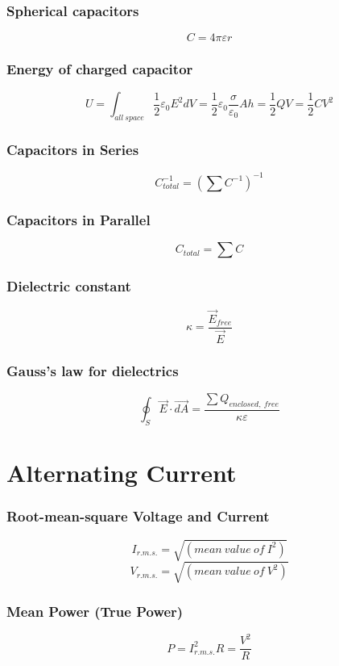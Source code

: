 \documentclass{article}
\begin{document}
\subsubsection*{Spherical capacitors}
\[C=4\pi\varepsilon r\]

\subsubsection*{Energy of charged capacitor}
\[U=\int_{all\ space} \frac{1}{2}\varepsilon_0E^2dV=\frac{1}{2}\varepsilon_0\frac{\sigma}{\varepsilon_0}Ah=\frac{1}{2}QV=\frac{1}{2}CV^2\]

\subsubsection*{Capacitors in Series}
\[C_{total}^{-1}=(\sum C^{-1})^{-1}\]

\subsubsection*{Capacitors in Parallel}
\[C_{total}=\sum C\]

\subsubsection*{Dielectric constant}
\[\kappa=\frac{\vec{E}_{free}}{\vec{E}}\]

\subsubsection*{Gauss's law for dielectrics}
\[\oint_S\vec{E}\cdot\vec{dA}=\frac{\sum Q_{enclosed,\ free}}{\kappa \varepsilon}\]

\section{Alternating Current}
\subsubsection*{Root-mean-square Voltage and Current}
\[I_{r.m.s.}=\sqrt{(mean\ value\ of\ I^2)}\]
\[V_{r.m.s.}=\sqrt{(mean\ value\ of\ V^2)}\]

\subsubsection*{Mean Power (True Power)}
\[P=I_{r.m.s.}^2R=\frac{V^2}{R}\]
\end{document}
